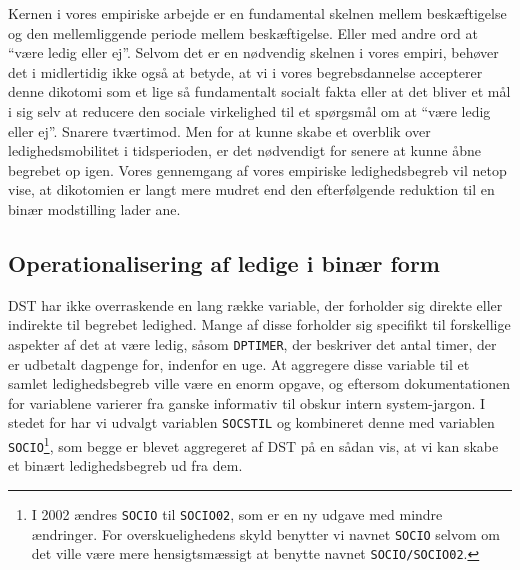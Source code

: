 Kernen i vores empiriske arbejde er en fundamental skelnen mellem beskæftigelse og den mellemliggende periode mellem beskæftigelse. Eller med andre ord at “være ledig eller ej”. Selvom det er en nødvendig skelnen i vores empiri, behøver det i midlertidig ikke også at betyde, at vi i vores begrebsdannelse accepterer denne dikotomi som et lige så fundamentalt socialt fakta eller at det bliver et mål i sig selv at reducere den sociale virkelighed til et spørgsmål om at “være ledig eller ej”. Snarere tværtimod. Men for at kunne skabe et overblik over ledighedsmobilitet i tidsperioden, er det nødvendigt for senere at kunne åbne begrebet op igen. Vores gennemgang af vores empiriske ledighedsbegreb vil netop vise, at dikotomien er langt mere mudret end den efterfølgende reduktion til en binær modstilling lader ane. 


\subsection{Operationalisering af ledige i binær form}

DST har ikke overraskende en lang række variable, der forholder sig direkte eller indirekte til begrebet ledighed. Mange af disse forholder sig specifikt til forskellige aspekter af det at være ledig, såsom \texttt{DPTIMER}, der beskriver det antal timer, der er udbetalt dagpenge for, indenfor en uge. At aggregere disse variable til et samlet ledighedsbegreb ville være en enorm opgave, og eftersom dokumentationen for variablene varierer fra ganske informativ til obskur intern system-jargon. I stedet for har vi udvalgt variablen \texttt{SOCSTIL} og kombineret denne med variablen \texttt{SOCIO}\footnote{I 2002 ændres \texttt{SOCIO} til \texttt{SOCIO02}, som er en ny udgave med mindre ændringer. For overskuelighedens skyld benytter vi navnet \texttt{SOCIO} selvom om det ville være mere hensigtsmæssigt at benytte navnet \texttt{SOCIO/SOCIO02}.}, som begge er blevet aggregeret af DST på en sådan vis, at vi kan skabe et binært ledighedsbegreb ud fra dem.

